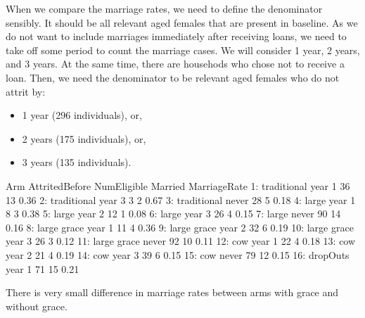 When we compare the marriage rates, we need to define the denominator sensibly. It should be all relevant aged females that are present in baseline. As we do not want to include marriages immediately after receiving loans, we need to take off some period to count the marriage cases. We will consider 1 year, 2 years, and 3 years. At the same time, there are househods who chose not to receive a loan. 
Then, we need the denominator to be relevant aged females who do not attrit by:
\begin{itemize}
\vspace{1.0ex}\setlength{\itemsep}{1.0ex}\setlength{\baselineskip}{12pt}
\item	1 year (296 individuals), or,
\item	2 years (175 individuals), or,
\item	3 years (135 individuals).
\end{itemize}
\begin{Schunk}
\begin{Soutput}
            Arm AttritedBefore NumEligible Married MarriageRate
 1: traditional         year 1          36      13         0.36
 2: traditional         year 3           3       2         0.67
 3: traditional          never          28       5         0.18
 4:       large         year 1           8       3         0.38
 5:       large         year 2          12       1         0.08
 6:       large         year 3          26       4         0.15
 7:       large          never          90      14         0.16
 8: large grace         year 1          11       4         0.36
 9: large grace         year 2          32       6         0.19
10: large grace         year 3          26       3         0.12
11: large grace          never          92      10         0.11
12:         cow         year 1          22       4         0.18
13:         cow         year 2          21       4         0.19
14:         cow         year 3          39       6         0.15
15:         cow          never          79      12         0.15
16:    dropOuts         year 1          71      15         0.21
\end{Soutput}
\end{Schunk}
\begin{palepinkleftbar}
\begin{finding}
There is very small difference in marriage rates between arms with grace and without grace.
\end{finding}
\end{palepinkleftbar}



